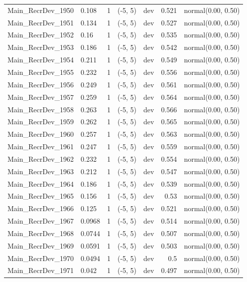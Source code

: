 \documentclass[
]{scrartcl}
\begin{document}
\begin{longtable}{llrllrl}
Main\_RecrDev\_1950 & 0.108 & 1 & (-5, 5) & dev & 0.521 & normal(0.00, 0.50) \\ 
Main\_RecrDev\_1951 & 0.134 & 1 & (-5, 5) & dev & 0.527 & normal(0.00, 0.50) \\ 
Main\_RecrDev\_1952 & 0.16 & 1 & (-5, 5) & dev & 0.535 & normal(0.00, 0.50) \\ 
Main\_RecrDev\_1953 & 0.186 & 1 & (-5, 5) & dev & 0.542 & normal(0.00, 0.50) \\ 
Main\_RecrDev\_1954 & 0.211 & 1 & (-5, 5) & dev & 0.549 & normal(0.00, 0.50) \\ 
Main\_RecrDev\_1955 & 0.232 & 1 & (-5, 5) & dev & 0.556 & normal(0.00, 0.50) \\ 
Main\_RecrDev\_1956 & 0.249 & 1 & (-5, 5) & dev & 0.561 & normal(0.00, 0.50) \\ 
Main\_RecrDev\_1957 & 0.259 & 1 & (-5, 5) & dev & 0.564 & normal(0.00, 0.50) \\ 
Main\_RecrDev\_1958 & 0.263 & 1 & (-5, 5) & dev & 0.566 & normal(0.00, 0.50) \\ 
Main\_RecrDev\_1959 & 0.262 & 1 & (-5, 5) & dev & 0.565 & normal(0.00, 0.50) \\ 
Main\_RecrDev\_1960 & 0.257 & 1 & (-5, 5) & dev & 0.563 & normal(0.00, 0.50) \\ 
Main\_RecrDev\_1961 & 0.247 & 1 & (-5, 5) & dev & 0.559 & normal(0.00, 0.50) \\ 
Main\_RecrDev\_1962 & 0.232 & 1 & (-5, 5) & dev & 0.554 & normal(0.00, 0.50) \\ 
Main\_RecrDev\_1963 & 0.212 & 1 & (-5, 5) & dev & 0.547 & normal(0.00, 0.50) \\ 
Main\_RecrDev\_1964 & 0.186 & 1 & (-5, 5) & dev & 0.539 & normal(0.00, 0.50) \\ 
Main\_RecrDev\_1965 & 0.156 & 1 & (-5, 5) & dev & 0.53 & normal(0.00, 0.50) \\ 
Main\_RecrDev\_1966 & 0.125 & 1 & (-5, 5) & dev & 0.521 & normal(0.00, 0.50) \\ 
Main\_RecrDev\_1967 & 0.0968 & 1 & (-5, 5) & dev & 0.514 & normal(0.00, 0.50) \\ 
Main\_RecrDev\_1968 & 0.0744 & 1 & (-5, 5) & dev & 0.507 & normal(0.00, 0.50) \\ 
Main\_RecrDev\_1969 & 0.0591 & 1 & (-5, 5) & dev & 0.503 & normal(0.00, 0.50) \\ 
Main\_RecrDev\_1970 & 0.0494 & 1 & (-5, 5) & dev & 0.5 & normal(0.00, 0.50) \\ 
Main\_RecrDev\_1971 & 0.042 & 1 & (-5, 5) & dev & 0.497 & normal(0.00, 0.50) \\ 

\end{longtable}
\end{document}
